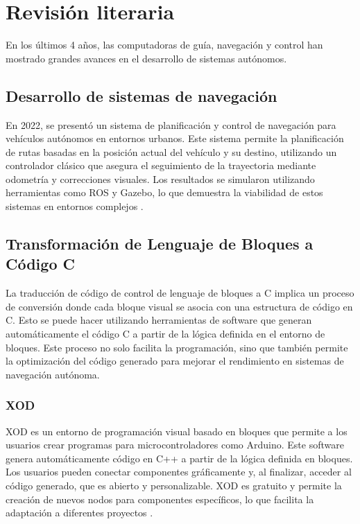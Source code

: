 \section{Revisión literaria}
En los últimos 4 años, las computadoras de guía, navegación y control han mostrado grandes avances en el desarrollo de sistemas autónomos.

\subsection{Desarrollo de sistemas de navegación}

En 2022, se presentó un sistema de planificación y control de navegación para vehículos autónomos en entornos urbanos. Este sistema permite la planificación 
de rutas basadas en la posición actual del vehículo y su destino, utilizando un controlador clásico que asegura el seguimiento de la trayectoria mediante 
odometría y correcciones visuales. Los resultados se simularon utilizando herramientas como ROS y Gazebo, lo que demuestra la viabilidad de estos sistemas en 
entornos complejos \cite{BarreraRamrez2022SistemaDP}. 

\subsection{Transformación de Lenguaje de Bloques a Código C}

La traducción de código de control de lenguaje de bloques a C implica un proceso de conversión donde cada bloque visual se asocia con una estructura de código 
en C. Esto se puede hacer utilizando herramientas de software que generan automáticamente el código C a partir de la lógica definida en el entorno de bloques. 
Este proceso no solo facilita la programación, sino que también permite la optimización del código generado para mejorar el rendimiento en sistemas de navegación 
autónoma.

\subsubsection{XOD}

XOD es un entorno de programación visual basado en bloques que permite a los usuarios crear programas para microcontroladores como Arduino. Este software 
genera automáticamente código en C++ a partir de la lógica definida en bloques. Los usuarios pueden conectar componentes gráficamente y, al finalizar, acceder 
al código generado, que es abierto y personalizable. XOD es gratuito y permite la creación de nuevos nodos para componentes específicos, lo que facilita la 
adaptación a diferentes proyectos \cite{Snchez2020ProgramacinDL}.

